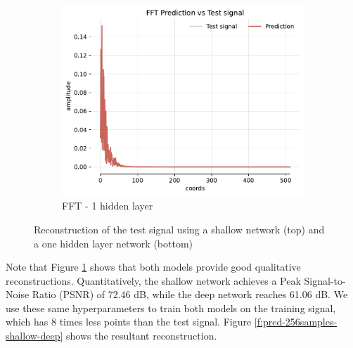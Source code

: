 \begin{figure}[!h]
    \begin{subfigure}[b]{0.32\textwidth}
        \centering
        \includegraphics[width=\textwidth]{img/ch3/fft-64hf-1hl-32w-filter3.pdf}
        \caption{FFT - 1 hidden layer}
    \end{subfigure}
    \caption{Reconstruction of the test signal using a shallow network (top) and a one hidden layer network (bottom)}
    \label{f:pred-2048samples-shallow-deep}
\end{figure}


Note that Figure \ref{f:pred-2048samples-shallow-deep} shows that both models provide good qualitative reconstructions. Quantitatively, the shallow network achieves a Peak Signal-to-Noise Ratio (PSNR) of 72.46 dB, while the deep network reaches 61.06 dB. We use these same hyperparameters to train both models on the training signal, which has 8 times less points than the test signal. Figure \ref{f:pred-256samples-shallow-deep} shows the resultant reconstruction.


